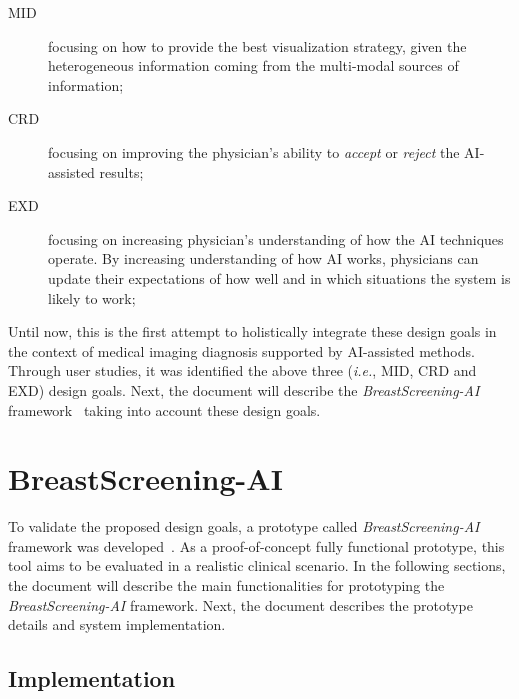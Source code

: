 \begin{description}
\item[\ac{MID}] focusing on how to provide the best visualization strategy, given the heterogeneous information coming from the multi-modal sources of information;

\vspace{0.50mm}

\item[\ac{CRD}] focusing on improving the physician's ability to {\it accept} or {\it reject} the \ac{AI}-assisted results;

\vspace{0.50mm}

\item[\ac{EXD}] focusing on increasing physician's understanding of how the \ac{AI} techniques operate. By increasing understanding of how \ac{AI} works, physicians can update their expectations of how well and in which situations the system is likely to work;
\end{description}

\vspace{1.50mm}

Until now, this is the first attempt to holistically integrate these design goals in the context of medical imaging diagnosis supported by \ac{AI}-assisted methods.
Through user studies, it was identified the above three ({\it i.e.}, \ac{MID}, \ac{CRD} and \ac{EXD}) design goals.
Next, the document will describe the {\it BreastScreening-AI} framework~\cite{CALISTO2021102607} taking into account these design goals.

\section{BreastScreening-AI}
\label{sec:chap005004}

To validate the proposed design goals, a prototype called {\it BreastScreening-AI} framework was developed~\cite{CALISTO2021102607}.
As a proof-of-concept fully functional prototype, this tool aims to be evaluated in a realistic clinical scenario.
In the following sections, the document will describe the main functionalities for prototyping the {\it BreastScreening-AI} framework.
Next, the document describes the prototype details and system implementation.

\subsection{Implementation}
\label{sec:chap005004001}

